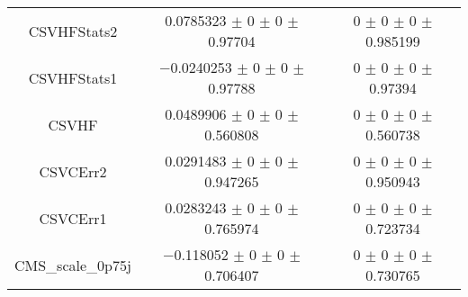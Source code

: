 \begin{table}
\begin{tabular}{ccc}
CSVHFStats2 	& \num{0.0785323} $\pm$ \num{0} $\pm$ \num{0} $\pm$ \num{0.97704} 	& \num{0} $\pm$ \num{0} $\pm$ \num{0} $\pm$ \num{0.985199}\\
CSVHFStats1 	& \num{-0.0240253} $\pm$ \num{0} $\pm$ \num{0} $\pm$ \num{0.97788} 	& \num{0} $\pm$ \num{0} $\pm$ \num{0} $\pm$ \num{0.97394}\\
CSVHF 	& \num{0.0489906} $\pm$ \num{0} $\pm$ \num{0} $\pm$ \num{0.560808} 	& \num{0} $\pm$ \num{0} $\pm$ \num{0} $\pm$ \num{0.560738}\\
CSVCErr2 	& \num{0.0291483} $\pm$ \num{0} $\pm$ \num{0} $\pm$ \num{0.947265} 	& \num{0} $\pm$ \num{0} $\pm$ \num{0} $\pm$ \num{0.950943}\\
CSVCErr1 	& \num{0.0283243} $\pm$ \num{0} $\pm$ \num{0} $\pm$ \num{0.765974} 	& \num{0} $\pm$ \num{0} $\pm$ \num{0} $\pm$ \num{0.723734}\\
CMS\_scale\_0p75j 	& \num{-0.118052} $\pm$ \num{0} $\pm$ \num{0} $\pm$ \num{0.706407} 	& \num{0} $\pm$ \num{0} $\pm$ \num{0} $\pm$ \num{0.730765}\\
\bottomrule
\end{tabular}
\end{table}